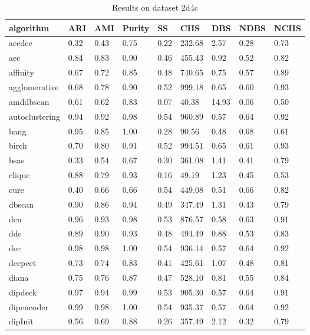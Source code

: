 \begin{table}[H]
\centering
\caption{Results on dataset 2d4c}
\label{tab:params:2d4c}
\begin{tabular}{|l|l|l|l|l|l|l|l|l|}
\hline
algorithm & ARI & AMI & Purity & SS & CHS & DBS & NDBS & NCHS \\
\hline
acedec & 0.32 & 0.43 & 0.75 & 0.22 & 232.68 & 2.57 & 0.28 & 0.73 \\
\hline
aec & 0.84 & 0.83 & 0.90 & 0.46 & 455.43 & 0.92 & 0.52 & 0.82 \\
\hline
affinity & 0.67 & 0.72 & 0.85 & 0.48 & 740.65 & 0.75 & 0.57 & 0.89 \\
\hline
agglomerative & 0.68 & 0.78 & 0.90 & 0.52 & 999.18 & 0.65 & 0.60 & 0.93 \\
\hline
amddbscan & 0.61 & 0.62 & 0.83 & 0.07 & 40.38 & 14.93 & 0.06 & 0.50 \\
\hline
autoclustering & 0.94 & 0.92 & 0.98 & 0.54 & 960.89 & 0.57 & 0.64 & 0.92 \\
\hline
bang & 0.95 & 0.85 & 1.00 & 0.28 & 90.56 & 0.48 & 0.68 & 0.61 \\
\hline
birch & 0.70 & 0.80 & 0.91 & 0.52 & 994.51 & 0.65 & 0.61 & 0.93 \\
\hline
bsas & 0.33 & 0.54 & 0.67 & 0.30 & 361.08 & 1.41 & 0.41 & 0.79 \\
\hline
clique & 0.88 & 0.79 & 0.93 & 0.16 & 49.19 & 1.23 & 0.45 & 0.53 \\
\hline
cure & 0.40 & 0.66 & 0.66 & 0.54 & 449.08 & 0.51 & 0.66 & 0.82 \\
\hline
dbscan & 0.90 & 0.86 & 0.94 & 0.49 & 347.49 & 1.31 & 0.43 & 0.79 \\
\hline
dcn & 0.96 & 0.93 & 0.98 & 0.53 & 876.57 & 0.58 & 0.63 & 0.91 \\
\hline
ddc & 0.89 & 0.90 & 0.93 & 0.48 & 494.49 & 0.88 & 0.53 & 0.83 \\
\hline
dec & 0.98 & 0.98 & 1.00 & 0.54 & 936.14 & 0.57 & 0.64 & 0.92 \\
\hline
deepect & 0.73 & 0.74 & 0.83 & 0.41 & 425.61 & 1.07 & 0.48 & 0.81 \\
\hline
diana & 0.75 & 0.76 & 0.87 & 0.47 & 528.10 & 0.81 & 0.55 & 0.84 \\
\hline
dipdeck & 0.97 & 0.94 & 0.99 & 0.53 & 905.30 & 0.57 & 0.64 & 0.91 \\
\hline
dipencoder & 0.99 & 0.98 & 1.00 & 0.54 & 935.37 & 0.57 & 0.64 & 0.92 \\
\hline
dipInit & 0.56 & 0.69 & 0.88 & 0.26 & 357.49 & 2.12 & 0.32 & 0.79 \\

\end{tabular}
\end{table}
